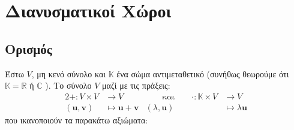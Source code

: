 


\let\vec\mathbf

\pagestyle{vangelis}




\chapter{Διανυσματικοί Χώροι}


\section{Ορισμός}

\begin{dfn}
\item {}
    Έστω $V$, μη κενό σύνολο και $\mathbb{K}$ ένα σώμα αντιμεταθετικό 
    (συνήθως θεωρούμε ότι $ \mathbb{K} = \mathbb{R} $ ή $\mathbb{C}$ ). 
    Το σύνολο $V$ μαζί με τις πράξεις:
    \begin{alignat*}{2}
        + \colon V \times V &\to V & \qquad \text{και} \qquad \cdot \colon \mathbb{K} 
        \times V &\to V \\ ( \vec{u}, \vec{v} ) &\mapsto \vec{u} + \vec{v} 
                 & ( \lambda, \vec{u} ) &\mapsto \lambda \vec{u} 
    \end{alignat*}
    \vspace{\baselineskip}
    που ικανοποιούν τα παρακάτω αξιώματα:


\end{dfn}
